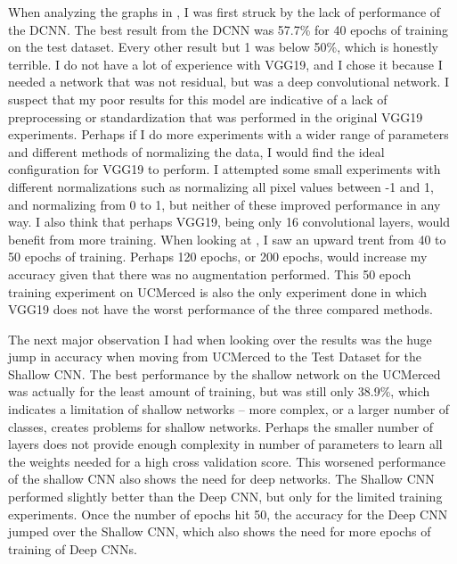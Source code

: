 \documentclass[12pt]{article}
\begin{document}
	When analyzing the graphs in , I was first struck by the lack of performance of the DCNN.  The best result from the DCNN was 57.7\% for 40 epochs of training on the test dataset. Every other result but 1 was below 50\%, which is honestly terrible. I do not have a lot of experience with VGG19, and I chose it because I needed a network that was not residual, but was a deep convolutional network. I suspect that my poor results for this model are indicative of a lack of preprocessing or standardization that was performed in the original VGG19 experiments. Perhaps if I do more experiments with a wider range of parameters and different methods of normalizing the data, I would find the ideal configuration for VGG19 to perform. I attempted some small experiments with different normalizations such as normalizing all pixel values between -1 and 1, and normalizing from 0 to 1, but neither of these improved performance in any way. I also think that perhaps VGG19, being only 16 convolutional layers, would benefit from more training. When looking at , I saw an upward trent from 40 to 50 epochs of training. Perhaps 120 epochs, or 200 epochs, would increase my accuracy given that there was no augmentation performed. This 50 epoch training experiment on UCMerced is also the only experiment done in which VGG19 does not have the worst performance of the three compared methods. 
	
	The next major observation I had when looking over the results was the huge jump in accuracy when moving from UCMerced to the Test Dataset for the Shallow CNN. The best performance by the shallow network on the UCMerced was actually for the least amount of training, but was still only 38.9\%, which indicates a limitation of shallow networks -- more complex, or a larger number of classes, creates problems for shallow networks. Perhaps the smaller number of layers does not provide enough complexity in number of parameters to learn all the weights needed for a high cross validation score. This worsened performance of the shallow CNN also shows the need for deep networks. The Shallow CNN performed slightly better than the Deep CNN, but only for the limited training experiments. Once the number of epochs hit 50, the accuracy for the Deep CNN jumped over the Shallow CNN, which also shows the need for more epochs of training of Deep CNNs. 
	
\end{document}
